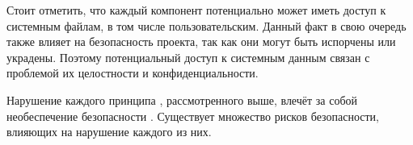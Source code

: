 %
Стоит отметить, что каждый компонент \PeerHood потенциально может иметь доступ к системным файлам, в том числе пользовательским. 
%
Данный факт в свою очередь также влияет на безопасность проекта, так как они могут быть испорчены или украдены. 
%
Поэтому потенциальный доступ к системным данным связан с проблемой их целостности и конфиденциальности. 

%
Нарушение каждого принципа \CIATriad, рассмотренного выше, влечёт за собой необеспечение безопасности \PeerHood. 
%
Существует множество рисков безопасности, влияющих на нарушение каждого из них.
